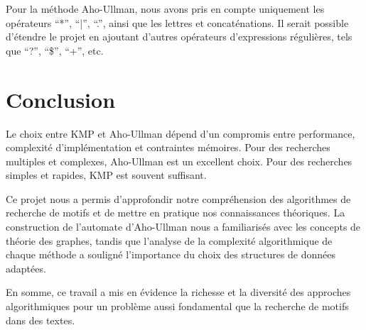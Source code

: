 \documentclass{article}
\begin{document}
Pour la méthode Aho-Ullman, nous avons pris en compte uniquement les opérateurs ``*'', ``|'', ``.'', ainsi que les lettres et concaténations. Il serait possible d’étendre le projet en ajoutant d'autres opérateurs d'expressions régulières, tels que ``?'', ``\$'', ``+'', etc.

\newpage
\section{Conclusion}
Le choix entre KMP et Aho-Ullman dépend d'un compromis entre performance, complexité d'implémentation et contraintes mémoires. Pour des recherches multiples et complexes, Aho-Ullman est un excellent choix. Pour des recherches simples et rapides, KMP est souvent suffisant.

Ce projet nous a permis d'approfondir notre compréhension des algorithmes de recherche de motifs et de mettre en pratique nos connaissances théoriques. La construction de l'automate d'Aho-Ullman nous a familiarisés avec les concepts de théorie des graphes, tandis que l'analyse de la complexité algorithmique de chaque méthode a souligné l'importance du choix des structures de données adaptées.

En somme, ce travail a mis en évidence la richesse et la diversité des approches algorithmiques pour un problème aussi fondamental que la recherche de motifs dans des textes.

\newpage


\end{document}
